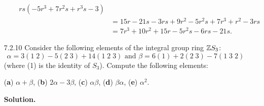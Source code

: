 \begin{enumerate}
\begin{enumerate}
\begin{align*}
                           rs(-5r^3 + 7r^2s + r^3s - 3) \\
                     &= 15r - 21s - 3rs + 9r^2 - 5r^2s + 7r^3 + r^2 - 3rs \\
                     &= 7r^3 + 10r^2 + 15r - 5r^2s -6rs - 21s.
               \end{align*}
      \end{enumerate}
   \item[7.2.10]  Consider the following elements of the integral group ring
                  $\mathbb{Z} S_3$:
                  $$\alpha = 3(1\;2) - 5(2\;3) + 14(1\;2\;3) \text{ and }
                    \beta = 6(1) + 2(2\;3) - 7(1\;3\;2)$$
                  (where (1) is the identity of $S_3$). Compute the following
                  elements:
            
                  (\textbf{a}) $\alpha + \beta$, \quad
                  (\textbf{b}) $2\alpha - 3\beta$, \quad
                  (\textbf{c}) $\alpha\beta$, \quad
                  (\textbf{d}) $\beta\alpha$,
                  (\textbf{e}) $\alpha^2$.

      \textbf{Solution.}


\end{enumerate}
